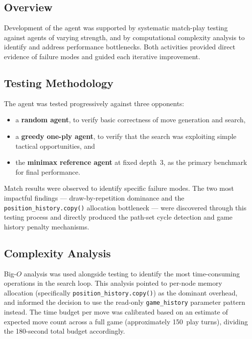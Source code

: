 \documentclass[10pt,a4paper]{article}
\begin{document}
\subsection{Overview}

Development of the agent was supported by systematic match-play testing against agents of varying strength, and by computational complexity analysis to identify and address performance bottlenecks. Both activities provided direct evidence of failure modes and guided each iterative improvement.

\subsection{Testing Methodology}

The agent was tested progressively against three opponents:

\begin{itemize}[noitemsep]
    \item a \textbf{random agent}, to verify basic correctness of move generation and search,
    \item a \textbf{greedy one-ply agent}, to verify that the search was exploiting simple tactical opportunities, and
    \item the \textbf{minimax reference agent} at fixed depth~3, as the primary benchmark for final performance.
\end{itemize}

Match results were observed to identify specific failure modes. The two most impactful findings --- draw-by-repetition dominance and the \texttt{position\_history.copy()} allocation bottleneck --- were discovered through this testing process and directly produced the path-set cycle detection and game history penalty mechanisms.

\subsection{Complexity Analysis}

Big-$O$ analysis was used alongside testing to identify the most time-consuming operations in the search loop. This analysis pointed to per-node memory allocation (specifically \texttt{position\_history.copy()}) as the dominant overhead, and informed the decision to use the read-only \texttt{game\_history} parameter pattern instead. The time budget per move was calibrated based on an estimate of expected move count across a full game (approximately 150~play turns), dividing the 180-second total budget accordingly.
\end{document}
